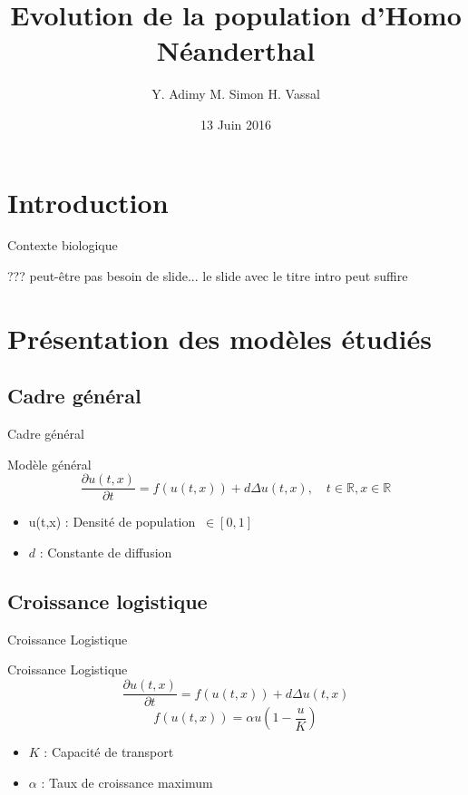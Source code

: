 \documentclass[10pt]{beamer}
\title[Population Néanderthal]{\textbf{Evolution de la population d'Homo Néanderthal}}
\author[Y. Adimy M. Simon H. Vassal]{Y. Adimy M. Simon H. Vassal}
\institute[]{INSA Lyon - Bioinformatique et Modélisation}
\date{13 Juin 2016}
\begin{document}

\begin{frame} 
   \titlepage
   \insertlogo
\end{frame}


\section{Introduction}
\begin{frame}{Contexte biologique}{}

???
peut-être pas besoin de slide... le slide avec le titre intro peut suffire 

\end{frame}


\section{Présentation des modèles étudiés}
\subsection*{Cadre général}
\begin{frame}{Cadre général}{}
\begin{block}{Modèle général}
	\begin{equation}
		\frac{\partial u(t,x)}{\partial t}=f(u(t,x))+d\Delta u(t,x), \quad t \in \mathbb{R}, x \in \mathbb{R}
	\end{equation}
\end{block}
\begin{itemize}
	\item u(t,x) : Densité de population  $\ \in[0,1]$ 
    \item $d$ : Constante de diffusion 
\end{itemize}
\end{frame}

\subsection{Croissance logistique}
\begin{frame}{Croissance Logistique}{}
\begin{block}{Croissance Logistique}
	$$\frac{\partial u(t,x)}{\partial t}=f(u(t,x))+d\Delta u(t,x)$$
	$$f(u(t,x))=\alpha u (1 - \dfrac{u}{K}) $$
\end{block}
\begin{itemize}
    \item $K$ : Capacité de transport 
    \item $\alpha$ : Taux de croissance maximum
\end{itemize}
\end{frame}
\end{document}
